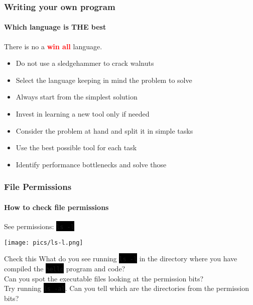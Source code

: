 \documentclass[unknownkeysallowed, 10pt, a4 paper, handout]{beamer}
\newcommand{\focus}[1]{\textbf{\textcolor{red}{#1}}}
\newcommand{\code}[1]{\colorbox{black}{\color{green}\texttt{#1}}}
\newcommand{\sidebyside}[5]{
  \begin{minipage}{#1\textwidth}
    #2
  \end{minipage} #3 \begin{minipage}{#4\textwidth}
    #5
  \end{minipage}
}
\begin{document}
\begin{frame}[label=whichone]
  \frametitle{Writing your own program}
  \framesubtitle{Which language is THE best}
  There is no a \focus{win all} language.
  \begin{itemize}
    \item Do not use a sledgehammer to crack walnuts
    \item Select the language keeping in mind the problem to solve
    \item Always start from the simplest solution
    \item Invest in learning a new tool only if needed
    \item Consider the problem at hand and split it in simple tasks
    \item Use the best possible tool for each task
    \item Identify performance bottlenecks and solve those
  \end{itemize}
\end{frame}


\begin{frame}
  \begin{center}
    \frametitle{File Permissions}
    \framesubtitle{How to check file permissions}

    \sidebyside{0.44}{
      \centering
      See permissions: \code{ls -l}
    }{\hfill}{0.52}{
      \begin{center}
        \texttt{[image: pics/ls-l.png]}
      \end{center}
    }
    \begin{alertblock}{Check this}
      What do you see running \code{ls -l} in the directory where you
        have compiled the \code{hello} program and code? \\
      Can you spot the executable files looking at the permission bits? \\
      Try running \code{ls -al}. Can you tell which are the directories
        from the permission bits?
    \end{alertblock}

  \end{center}
\end{frame}
\end{document}

